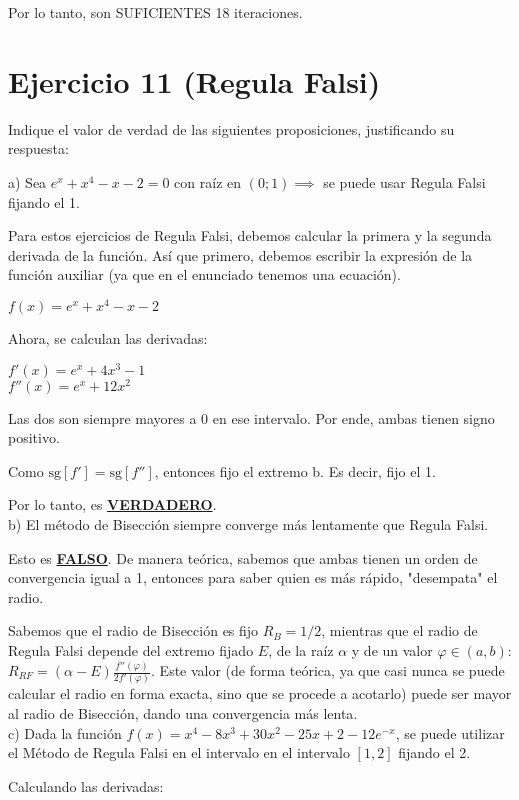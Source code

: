 \documentclass[11pt]{article}
\begin{document}
	Por lo tanto, son SUFICIENTES 18 iteraciones.
	
	\section{Ejercicio 11 (Regula Falsi)}
	Indique el valor de verdad de las siguientes proposiciones, justificando su respuesta:
	
	a) Sea $e^x+x^4-x-2=0$ con raíz en $(0;1) \implies$ se puede usar Regula Falsi fijando el 1.
	
	Para estos ejercicios de Regula Falsi, debemos calcular la primera y la segunda derivada de la función. Así que primero, debemos escribir la expresión de la función auxiliar (ya que en el enunciado tenemos una ecuación).
	
	$f(x)=e^x+x^4-x-2$
	
	Ahora, se calculan las derivadas:
	
	$f'(x)=e^x+4x^3-1$\\
	$f''(x)=e^x+12x^2$
	
	Las dos son siempre mayores a 0 en ese intervalo. Por ende, ambas tienen signo positivo.
	
	Como $\text{sg}[f']=\text{sg}[f'']$, entonces fijo el extremo b. Es decir, fijo el 1.
	
	Por lo tanto, es \textbf{\underline{VERDADERO}}.\\
	
	b) El método de Bisección siempre converge más lentamente que Regula Falsi.
	
	Esto es \textbf{\underline{FALSO}}. De manera teórica, sabemos que ambas tienen un orden de convergencia igual a 1, entonces para saber quien es más rápido, "desempata" el radio.
	
	Sabemos que el radio de Bisección es fijo $R_B=1/2$, mientras que el radio de Regula Falsi depende del extremo fijado $E$, de la raíz $\alpha$ y de un valor $\varphi \in (a,b)$: $R_{RF}=(\alpha - E) \frac{f''(\varphi)}{2f'(\varphi)}$. Este valor (de forma teórica, ya que casi nunca se puede calcular el radio en forma exacta, sino que se procede a acotarlo) puede ser mayor al radio de Bisección, dando una convergencia más lenta.\\
	
	c) Dada la función $f(x)=x^4-8x^3+30x^2-25x+2-12e^{-x}$, se puede utilizar el Método de Regula Falsi en el intervalo en el intervalo $[1,2]$ fijando el 2.
	
	Calculando las derivadas:
	
\end{document}
